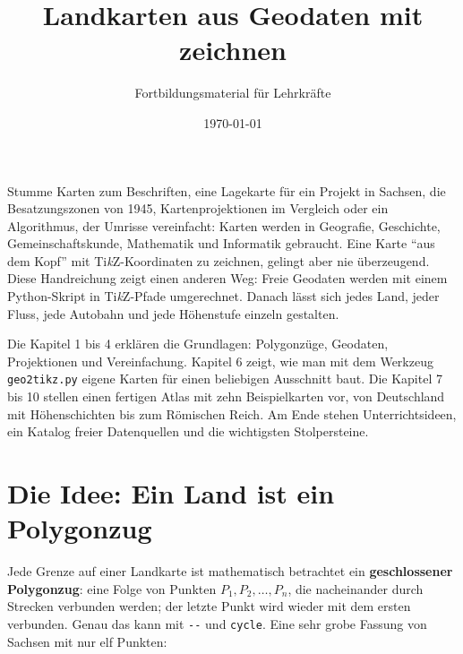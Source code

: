 



\title{Landkarten aus Geodaten mit \TikZ zeichnen}
\author{Fortbildungsmaterial für Lehrkräfte}
\date{\today}
\pagestyle{plain}
\setlength{\parskip}{1.5em} %
\setlength{\emergencystretch}{2em} %






\maketitle

Stumme Karten zum Beschriften, eine Lagekarte für ein Projekt in Sachsen, die Besatzungszonen von 1945, Kartenprojektionen im Vergleich oder ein Algorithmus, der Umrisse vereinfacht: Karten werden in Geografie, Geschichte, Gemeinschaftskunde, Mathematik und Informatik gebraucht. Eine Karte \enquote{aus dem Kopf} mit Ti\textit{k}Z-Koordinaten zu zeichnen, gelingt aber nie überzeugend. Diese Handreichung zeigt einen anderen Weg: Freie Geodaten werden mit einem Python-Skript in Ti\textit{k}Z-Pfade umgerechnet. Danach lässt sich jedes Land, jeder Fluss, jede Autobahn und jede Höhenstufe einzeln gestalten.

Die Kapitel 1 bis 4 erklären die Grundlagen: Polygonzüge, Geodaten, Projektionen und Vereinfachung. Kapitel 6 zeigt, wie man mit dem Werkzeug \texttt{geo2tikz.py} eigene Karten für einen beliebigen Ausschnitt baut. Die Kapitel 7 bis 10 stellen einen fertigen Atlas mit zehn Beispielkarten vor, von Deutschland mit Höhenschichten bis zum Römischen Reich. Am Ende stehen Unterrichtsideen, ein Katalog freier Datenquellen und die wichtigsten Stolpersteine.

\tableofcontents

\newpage

\section{Die Idee: Ein Land ist ein Polygonzug}

Jede Grenze auf einer Landkarte ist mathematisch betrachtet ein \textbf{geschlossener Polygonzug}: eine Folge von Punkten $P_1, P_2, \dots, P_n$, die nacheinander durch Strecken verbunden werden; der letzte Punkt wird wieder mit dem ersten verbunden. Genau das kann \TikZ mit \texttt{-{}-} und \texttt{cycle}. Eine sehr grobe Fassung von Sachsen mit nur elf Punkten:

